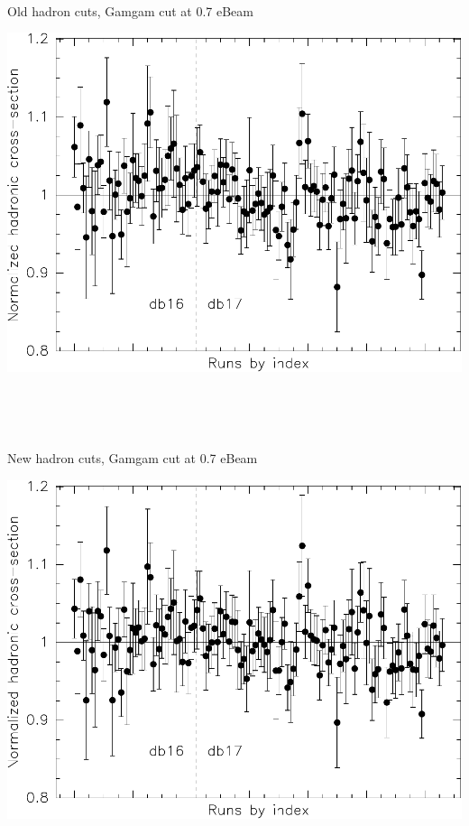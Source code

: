\documentclass[landscape]{article}
\newenvironment{slide}{\mbox{ }\vfill}{\vfill \mbox{ } \pagebreak}
\begin{document}
\begin{slide}
  \begin{center}
    \vfill
    Old hadron cuts, Gamgam cut at 0.7 eBeam

    \vfill
    \includegraphics[width=0.85\linewidth]{prepforpta3_oldhadronall.pdf}
  \end{center}
\end{slide}

\begin{slide}
  \begin{center}
    \vfill
    New hadron cuts, Gamgam cut at 0.7 eBeam

    \vfill
    \includegraphics[width=0.85\linewidth]{prepforpta3.pdf}
  \end{center}
\end{slide}
\end{document}
